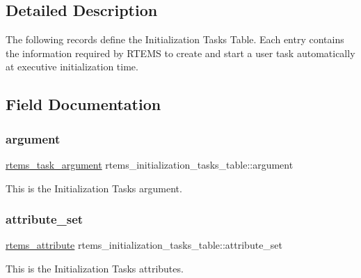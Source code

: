 \subsection{Detailed Description}
The following records define the Initialization Tasks Table. Each entry contains the information required by R\+T\+E\+MS to create and start a user task automatically at executive initialization time. 

\subsection{Field Documentation}
\mbox{\label{structrtems__initialization__tasks__table_aef6f277b2c00ff8cf865ec6f5fbe46ec}} 
\subsubsection{\texorpdfstring{argument}{argument}}
{\footnotesize\ttfamily \mbox{\hyperlink{group__ClassicTasks_gaf202f985ef5a3156f29eae99a0536842}{rtems\+\_\+task\+\_\+argument}} rtems\+\_\+initialization\+\_\+tasks\+\_\+table\+::argument}

This is the Initialization Task\textquotesingle{}s argument. \mbox{\label{structrtems__initialization__tasks__table_ad663000b02b4452f6c524151ae68228e}} 
\subsubsection{\texorpdfstring{attribute\_set}{attribute\_set}}
{\footnotesize\ttfamily \mbox{\hyperlink{group__ClassicAttributes_gaea40313cf78ed843e09c4315d0a10f79}{rtems\+\_\+attribute}} rtems\+\_\+initialization\+\_\+tasks\+\_\+table\+::attribute\+\_\+set}

This is the Initialization Task\textquotesingle{}s attributes. \mbox{\label{structrtems__initialization__tasks__table_a0b2b15fa7235fc42ed7f4cf3a051d33b}} 
